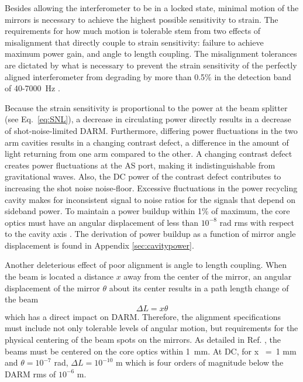 
Besides allowing the interferometer to be in a locked state, minimal motion of the mirrors is necessary to achieve the highest possible sensitivity to strain. The requirements for how much motion is tolerable stem from two effects of misalignment that directly couple to strain sensitivity: failure to achieve maximum power gain, and angle to length coupling. The misalignment tolerances are dictated by what is necessary to prevent the strain sensitivity of the perfectly aligned interferometer from degrading by more than 0.5\% in the detection band of 40-7000~Hz \cite{Fritschel1997Alignment}.

Because the strain sensitivity is proportional to the power at the beam splitter (see Eq.~\ref{eq:SNL}), a decrease in circulating power directly results in a decrease of shot-noise-limited DARM. Furthermore, differing power fluctuations in the two arm cavities results in a changing contrast defect, a difference in the amount of light returning from one arm compared to the other. A changing contrast defect creates power fluctuations at the AS port, making it indistinguishable from gravitational waves. Also, the DC power of the contrast defect contributes to increasing the shot noise noise-floor. Excessive fluctuations in the power recycling cavity makes for inconsistent signal to noise ratios for the signals that depend on sideband power. To maintain a power buildup within 1\% of maximum, the core optics must have an angular displacement of less than $10^{-8}$ rad rms with respect to the cavity axis \cite{ISCGroup1998ASC}. The derivation of power buildup as a function of mirror angle displacement is found in Appendix \ref{sec:cavitypower}.

Another deleterious effect of poor alignment is angle to length coupling. 
When the beam is located a distance $x$  away from the center of the mirror, an
angular displacement of the mirror $\theta$ about its center results in a path
length change of the beam
\begin{equation}
\Delta{L} = x \theta
\end{equation}
which has a direct impact on DARM. Therefore, the alignment specifications must include not only tolerable levels of angular motion, but requirements for the physical centering of the beam spots on the mirrors. As detailed in Ref. \cite{ISCGroup1998ASC}, the beams must be centered on the core optics within 1~mm. At DC, for x ~=~1 mm and $\theta = 10^{-7}$ rad, $\Delta{L} = 10^{-10}$ m which is four orders of magnitude below the DARM rms of $10^{-6}$ m. 




